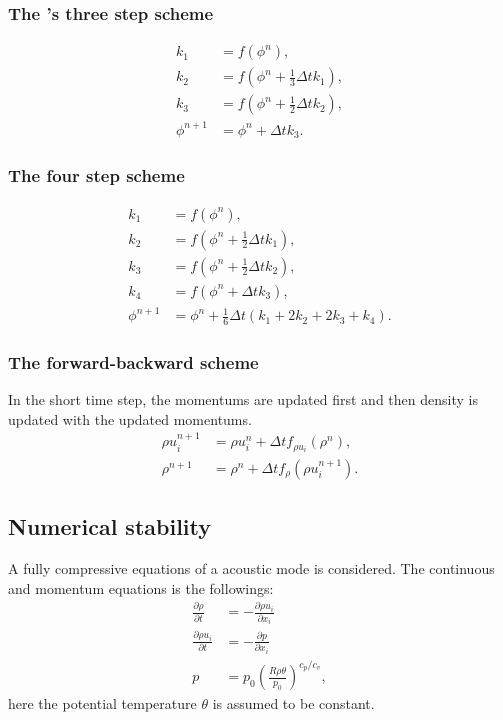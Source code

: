 \subsubsection{The \citet{Wicker_2002}'s three step scheme}

\begin{align}
  k_1 &= f(\phi^n), \\
  k_2 &= f\left(\phi^n + \frac{1}{3}\Delta t k_1\right), \\
  k_3 &= f\left(\phi^n + \frac{1}{2}\Delta t k_2\right), \\
  \phi^{n+1} &= \phi^n + \Delta t k_3.
\end{align}


\subsubsection{The four step scheme}

\begin{align}
  k_1 &= f(\phi^n), \\
  k_2 &= f\left(\phi^n + \frac{1}{2}\Delta t k_1\right), \\
  k_3 &= f\left(\phi^n + \frac{1}{2}\Delta t k_2\right), \\
  k_4 &= f\left(\phi^n + \Delta t k_3\right), \\
  \phi^{n+1} &= \phi^n + \frac{1}{6}\Delta t (k_1 + 2k_2 + 2k_3 + k_4).
\end{align}


\subsubsection{The forward-backward scheme}
In the short time step, the momentums are updated first and then density is updated with the updated momentums.
\begin{align}
  \rho u^{n+1}_i &= \rho u^n_i + \Delta t f_{\rho u_i}(\rho^n), \\
  \rho^{n+1}     &= \rho^n + \Delta t f_{\rho}(\rho u^{n+1}_i).
\end{align}

\subsection{Numerical stability}

A fully compressive equations of a acoustic mode is considered.
The continuous and momentum equations is the followings:
\begin{align}
  \frac{\partial \rho}{\partial t} &=
  - \frac{\partial \rho u_i}{\partial x_i} \\
  \frac{\partial \rho u_i}{\partial t} &=
  - \frac{\partial p}{\partial x_i} \\
  p &= p_0 \left( \frac{R \rho \theta}{p_0} \right)^{c_p/c_v},
\end{align}
here the potential temperature $\theta$ is assumed to be constant.

